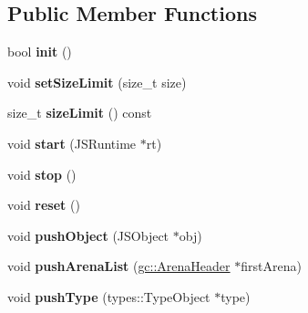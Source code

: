 \subsection*{Public Member Functions}
\begin{DoxyCompactItemize}
\item 
\hypertarget{structjs_1_1_g_c_marker_a2f85342fada55e85961f23b729b52026}{bool {\bfseries init} ()}\label{structjs_1_1_g_c_marker_a2f85342fada55e85961f23b729b52026}

\item 
\hypertarget{structjs_1_1_g_c_marker_abc7b0839b18b11469d13ac00b29297c6}{void {\bfseries set\-Size\-Limit} (size\-\_\-t size)}\label{structjs_1_1_g_c_marker_abc7b0839b18b11469d13ac00b29297c6}

\item 
\hypertarget{structjs_1_1_g_c_marker_af399d9fd09b74daf7606ae1f8798af89}{size\-\_\-t {\bfseries size\-Limit} () const }\label{structjs_1_1_g_c_marker_af399d9fd09b74daf7606ae1f8798af89}

\item 
\hypertarget{structjs_1_1_g_c_marker_a328c418ebeb1fea7b54d879a8e1b89de}{void {\bfseries start} (J\-S\-Runtime $\ast$rt)}\label{structjs_1_1_g_c_marker_a328c418ebeb1fea7b54d879a8e1b89de}

\item 
\hypertarget{structjs_1_1_g_c_marker_a0bc574aa1e175dcd583b7eac9d8ae817}{void {\bfseries stop} ()}\label{structjs_1_1_g_c_marker_a0bc574aa1e175dcd583b7eac9d8ae817}

\item 
\hypertarget{structjs_1_1_g_c_marker_aff477b64607c79a837e56e1f3c80a001}{void {\bfseries reset} ()}\label{structjs_1_1_g_c_marker_aff477b64607c79a837e56e1f3c80a001}

\item 
\hypertarget{structjs_1_1_g_c_marker_a077dcf7b9a9c2732790d250fc633b82c}{void {\bfseries push\-Object} (J\-S\-Object $\ast$obj)}\label{structjs_1_1_g_c_marker_a077dcf7b9a9c2732790d250fc633b82c}

\item 
\hypertarget{structjs_1_1_g_c_marker_ab2ead1d9fa2864f6bae3eb1662b50672}{void {\bfseries push\-Arena\-List} (\hyperlink{structjs_1_1gc_1_1_arena_header}{gc\-::\-Arena\-Header} $\ast$first\-Arena)}\label{structjs_1_1_g_c_marker_ab2ead1d9fa2864f6bae3eb1662b50672}

\item 
\hypertarget{structjs_1_1_g_c_marker_a855c3d820c8456002a2a6fda0f9aa38c}{void {\bfseries push\-Type} (types\-::\-Type\-Object $\ast$type)}\label{structjs_1_1_g_c_marker_a855c3d820c8456002a2a6fda0f9aa38c}


\end{DoxyCompactItemize}
